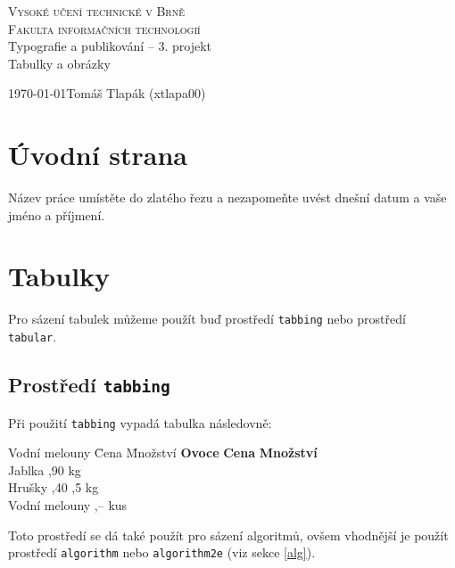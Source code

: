 \documentclass[11pt, a4paper]{article}
\begin{document}
\begin{titlepage}
    \begin{center}
    	{\textsc{\Huge Vysoké učení technické v Brně}} \\[0,7em]
    	 \textsc{{\huge Fakulta informačních technologií}}\\
    	{\LARGE Typografie a publikování – 3. projekt\\[0,3em]
		{\Huge Tabulky a obrázky}}
    \end{center}
	 \LARGE \today \hfill Tomáš Tlapák (xtlapa00)
\end{titlepage}

\section{Úvodní strana}
Název práce umístěte do zlatého řezu a nezapomeňte uvést dnešní datum a vaše jméno a příjmení.

\section{Tabulky}
Pro sázení tabulek můžeme použít buď prostředí \verb|tabbing| nebo prostředí \verb|tabular|.

\subsection{Prostředí \texttt{tabbing}}
Při použití \verb|tabbing| vypadá tabulka následovně:

\begin{tabbing}
Vodní melouny \quad \= Cena \quad \=  Množství \kill
\textbf{Ovoce} \> \textbf{Cena} \> \textbf{Množství}\\
Jablka ,90  kg\\
Hrušky ,40 ,5 kg\\
Vodní melouny ,–  kus
\end{tabbing}

\noindent Toto prostředí se dá také použít pro sázení algoritmů, ovšem vhodnější je použít prostředí \verb|algorithm| nebo \verb|algorithm2e| (viz sekce \ref{alg}).
\end{document}
